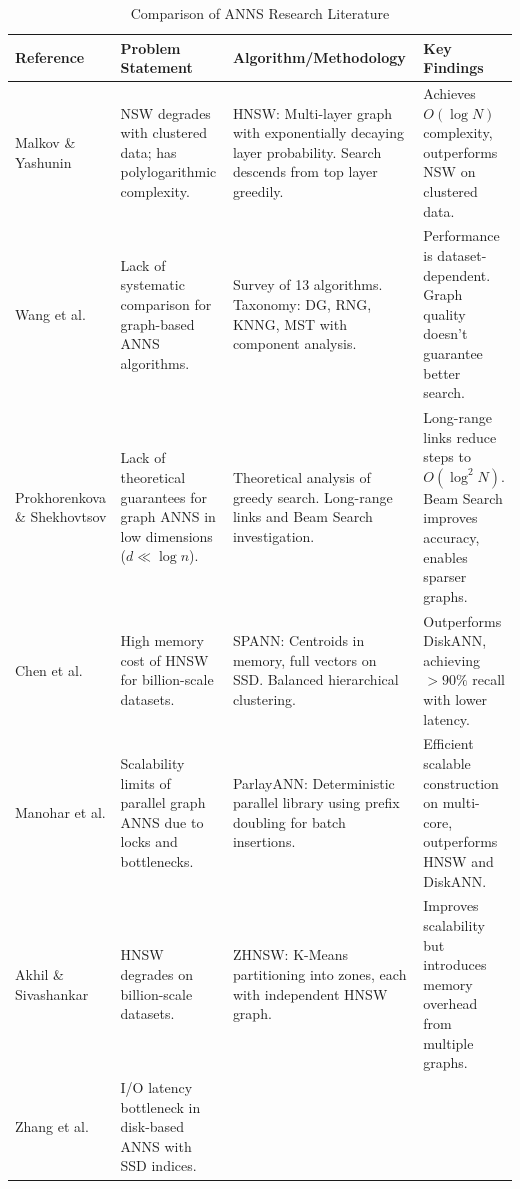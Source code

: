 \documentclass[conference]{IEEEtran}
\begin{document}
\begin{table}[t]
\caption{Comparison of ANNS Research Literature}
\label{tab:comparison}
\centering
\scriptsize
\renewcommand{\arraystretch}{0.9}
\setlength{\tabcolsep}{3pt}
\begin{tabularx}{\textwidth}{
    >{\RaggedRight}p{} 
    >{\RaggedRight}p{} 
    >{\RaggedRight}p{} 
    >{\RaggedRight\arraybackslash}X
}
\toprule
\textbf{Reference} & \textbf{Problem Statement} & \textbf{Algorithm/Methodology} & \textbf{Key Findings} \\
\midrule
Malkov \& Yashunin \cite{malkov2020} & 
NSW degrades with clustered data; has polylogarithmic complexity. & 
HNSW: Multi-layer graph with exponentially decaying layer probability. Search descends from top layer greedily. & 
Achieves $O(\log N)$ complexity, outperforms NSW on clustered data. \\
\midrule
Wang et al. \cite{wang2021} & 
Lack of systematic comparison for graph-based ANNS algorithms. & 
Survey of 13 algorithms. Taxonomy: DG, RNG, KNNG, MST with component analysis. & 
Performance is dataset-dependent. Graph quality doesn't guarantee better search. \\
\midrule
Prokhorenkova \& Shekhovtsov \cite{prokhorenkova2020} & 
Lack of theoretical guarantees for graph ANNS in low dimensions ($d \ll \log n$). & 
Theoretical analysis of greedy search. Long-range links and Beam Search investigation. & 
Long-range links reduce steps to $O(\log^2 N)$. Beam Search improves accuracy, enables sparser graphs. \\
\midrule
Chen et al. \cite{chen2021} & 
High memory cost of HNSW for billion-scale datasets. & 
SPANN: Centroids in memory, full vectors on SSD. Balanced hierarchical clustering. & 
Outperforms DiskANN, achieving $>90\%$ recall with lower latency. \\
\midrule
Manohar et al. \cite{manohar2024} & 
Scalability limits of parallel graph ANNS due to locks and bottlenecks. & 
ParlayANN: Deterministic parallel library using prefix doubling for batch insertions. & 
Efficient scalable construction on multi-core, outperforms HNSW and DiskANN. \\
\midrule
Akhil \& Sivashankar \cite{akhil2025} & 
HNSW degrades on billion-scale datasets. & 
ZHNSW: K-Means partitioning into zones, each with independent HNSW graph. & 
Improves scalability but introduces memory overhead from multiple graphs. \\
\midrule
Zhang et al. \cite{zhang2025} & 
I/O latency bottleneck in disk-based ANNS with SSD indices. & 

\end{tabularx}
\end{table}
\end{document}
